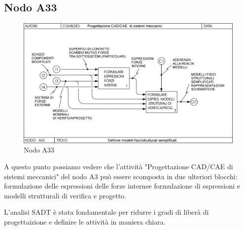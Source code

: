 \subsection{Nodo A33}
\begin{figure}[h!]
\centering
  \includegraphics[width=.6\textwidth]{imgs/NodoA33.pdf}
\caption{Nodo A33}
\label{fig:NodoA33}
\end{figure}
A questo punto possiamo vedere che l'attività "Progettazione CAD/CAE di sistemi meccanici" del nodo A3 può essere scomposta in due ulteriori blocchi: formulazione delle espressioni delle forze internee formulazione di espressioni e modelli strutturali di verifica e progetto.

L'analisi SADT è stata fondamentale per ridurre i gradi di liberà di progettaizione e definire le attività in maniera chiara. 